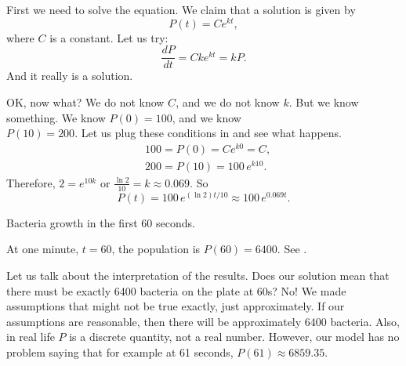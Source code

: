 \begin{exampleSol}
First we need to solve the equation.  We claim that a solution is given by
\begin{equation*}
P(t) = C e^{kt} ,
\end{equation*}
where $C$ is a constant.  Let us try:
\begin{equation*}
\frac{dP}{dt} = C k e^{kt} = k P .
\end{equation*}
And it really is a solution.

OK\@, now what?  We do not know $C$, and we do not know $k$.  But we know
something.  We know $P(0) = 100$, and we know \\
$P(10) = 200$.  Let us plug these conditions in and see what happens.
\begin{align*}
& 100 = P(0) = C e^{k0} = C ,\\
& 200 = P(10) = 100 \, e^{k10} .
\end{align*}
Therefore, $2 = e^{10k}$ or $\frac{\ln 2}{10} = k \approx 0.069$.
So 
\begin{equation*}
P(t) = 100 \, e^{(\ln 2) t / 10} \approx 100 \, e^{0.069 t} .
\end{equation*}

\begin{mywrapfig}{3.35in}
\capstart
{}
\caption{Bacteria growth in the first 60 seconds.\label{intro:plotbactfig}}
\end{mywrapfig}
%
%



At one minute, $t=60$, the population is $P(60) = 6400$.  See
.

Let us talk about the interpretation of the results.  Does our solution
mean that
there must be exactly 6400 bacteria on the plate at 60s?  No!  We made
assumptions that might not be true exactly, just approximately.
If our assumptions are reasonable,
then there will be approximately 6400 bacteria.
Also, in real life $P$ is a
discrete quantity, not a real number.  However, our model has no problem saying
that for example at 61 seconds, $P(61) \approx 6859.35$.
\end{exampleSol}

